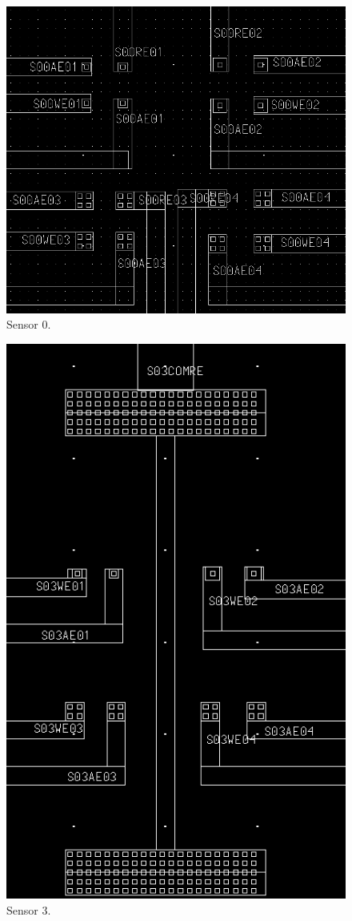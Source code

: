 \begin{figure}
	\centering
	\includegraphics[width=0.7\linewidth]{figures/s00.png}
	\caption{Sensor 0.}
	\label{s00}
\end{figure}

\begin{figure}
	\centering
	\includegraphics[width=0.7\linewidth]{figures/s03.png}
	\caption{Sensor 3.}
	\label{s03}
\end{figure}

